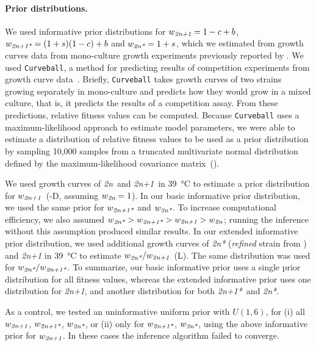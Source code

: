 \documentclass[12pt]{extarticle}
\newcommand{\euwt}{\emph{2n}}
\newcommand{\anwt}{\emph{2n+1}}
\newcommand{\eumt}{\emph{2n*}}
\newcommand{\anmt}{\emph{2n+1*}}
\begin{document}
\paragraph{Prior distributions.} We used informative prior distributions for $w_{\anwt}=1-c+b$, $w_{\anmt}=(1+s)(1-c)+b$ and $w_{\eumt}=1+s$, which we estimated from growth curves data from mono-culture growth experiments previously reported by \citet[Figs. 3C, 4A, and S2]{Yona2012}.
We used \texttt{Curveball}, a method for predicting results of competition experiments from growth curve data~\citep[\href{https://curveball.yoavram.com}{curveball.yoavram.com}]{Ram2019}. Briefly, \texttt{Curveball} takes growth curves of two strains growing separately in mono-culture and predicts how they would grow in a mixed culture, that is, it predicts the results of a competition assay.
From these predictions, relative fitness values can be computed. Because \texttt{Curveball} uses a maximum-likelihood approach to estimate model parameters, we were able to estimate a distribution of relative fitness values to be used as a prior distribution by sampling 10,000 samples from a truncated multivariate normal distribution defined by the maximum-likelihood covariance matrix~().

We used growth curves of \euwt\ and \anwt\ in \SI{39}{\celsius} to estimate a prior distribution for $w_{\anwt}$~(-D, assuming $w_{\euwt}=1$). In our basic informative prior distribution, we used the same prior for $w_{\anmt}$ and $w_{\eumt}$. 
To increase computational efficiency, we also assumed $w_\eumt>w_\anmt>w_\anwt>w_\euwt$; running the inference without this assumption produced similar results. 
In our extended informative prior distribution, we used additional growth curves of \eumt\; (\emph{refined} strain from \citet{Yona2012}) and \anwt\; in \SI{39}{\celsius} to estimate $w_{\eumt}/w_{\anwt}$~(L). The same distribution was used for $w_{\eumt}/w_{\anmt}$. 
To summarize, our basic informative prior uses a single prior distribution for all fitness values, whereas the extended informative prior uses one distribution for \anwt, and another distribution for both \anmt\ and \eumt. 

As a control, we tested an uninformative uniform prior with $\mathit{U}(1,6)$, for (i) all $w_{\anwt}$, $w_{\anmt}$, $w_{\eumt}$, or (ii) only for $w_{\anmt}$, $w_{\eumt}$, using the above informative prior for $w_{\anwt}$. In these cases the inference algorithm failed to converge.
 
\end{document}
